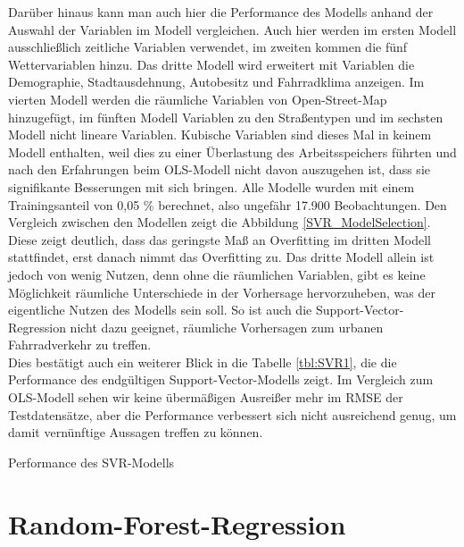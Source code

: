 \documentclass[a4paper,12pt]{thesis}
\begin{document}
Darüber hinaus kann man auch hier die Performance des Modells anhand der Auswahl der Variablen im Modell vergleichen. Auch hier werden im ersten Modell ausschließlich zeitliche Variablen verwendet, im zweiten kommen die fünf Wettervariablen hinzu. Das dritte Modell wird erweitert mit Variablen die Demographie, Stadtausdehnung, Autobesitz und Fahrradklima anzeigen. Im vierten Modell werden die räumliche Variablen von Open-Street-Map hinzugefügt, im fünften Modell Variablen zu den Straßentypen und im sechsten Modell nicht lineare Variablen. Kubische Variablen sind dieses Mal in keinem Modell enthalten, weil dies zu einer Überlastung des Arbeitsspeichers führten und nach den Erfahrungen beim OLS-Modell nicht davon auszugehen ist, dass sie signifikante Besserungen mit sich bringen. Alle Modelle wurden mit einem Trainingsanteil von 0,05 \% berechnet, also ungefähr 17.900 Beobachtungen. Den Vergleich zwischen den Modellen zeigt die Abbildung \ref{SVR_ModelSelection}. Diese zeigt deutlich, dass das geringste Maß an Overfitting im dritten Modell stattfindet, erst danach nimmt das Overfitting zu. Das dritte Modell allein ist jedoch von wenig Nutzen, denn ohne die räumlichen Variablen, gibt es keine Möglichkeit räumliche Unterschiede in der Vorhersage hervorzuheben, was der eigentliche Nutzen des Modells sein soll. So ist auch die Support-Vector-Regression nicht dazu geeignet, räumliche Vorhersagen zum urbanen Fahrradverkehr zu treffen.\\
Dies bestätigt auch ein weiterer Blick in die Tabelle \ref{tbl:SVR1}, die die Performance des endgültigen Support-Vector-Modells zeigt. Im Vergleich zum OLS-Modell sehen wir keine übermäßigen Ausreißer mehr im RMSE der Testdatensätze, aber die Performance verbessert sich nicht ausreichend genug, um damit vernünftige Aussagen treffen zu können.

\begin{table}
	\caption{Performance des SVR-Modells}
	\label{tbl:SVR1}
\end{table}

\section{Random-Forest-Regression}\label{RF}
\end{document}
